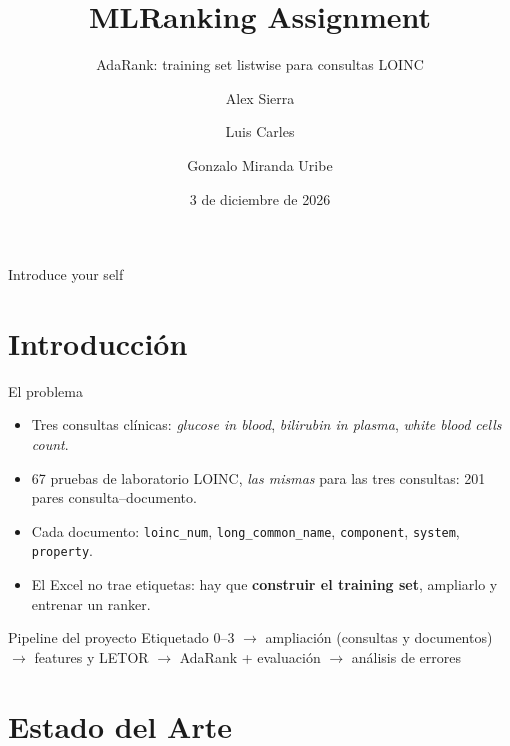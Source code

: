 \documentclass{beamer}
\author[Sierra, Carles, Miranda]{Alex Sierra \and Luis Carles \and Gonzalo Miranda Uribe}
\title{MLRanking Assignment}
\subtitle{AdaRank: training set listwise para consultas LOINC}
\institute [ETSIINF, UPM] {Escuela Técnica Superior de Ingenieros Informáticos\\Universidad Politécnica de Madrid}
\date{3 de diciembre de 2026}
\newcommand{\code}[1]{\texttt{#1}}
\begin{document}
\begin{frame}
    \titlepage


    \begin{note}
        {Introduce your self}
    \end{note}

\end{frame}

\begin{frame}
    \tableofcontents[sectionstyle=show,subsectionstyle=show/shaded/hide,subsubsectionstyle=show/shaded/hide]
\end{frame}


\section{Introducción}

\begin{frame}{El problema}
    \begin{itemize}
        \item Tres consultas clínicas: \emph{glucose in blood}, \emph{bilirubin in plasma}, \emph{white blood cells count}.
        \item 67 pruebas de laboratorio LOINC, \emph{las mismas} para las tres consultas: 201 pares consulta--documento.
        \item Cada documento: \code{loinc\_num}, \code{long\_common\_name}, \code{component}, \code{system}, \code{property}.
        \item El Excel no trae etiquetas: hay que \textbf{construir el training set}, ampliarlo y entrenar un ranker.
    \end{itemize}
    \vspace{6pt}
    \begin{block}{Pipeline del proyecto}
        \small Etiquetado 0--3 $\rightarrow$ ampliación (consultas y documentos) $\rightarrow$ features y LETOR
        $\rightarrow$ AdaRank + evaluación $\rightarrow$ análisis de errores
    \end{block}

\end{frame}


\section{Estado del Arte}
\end{document}

